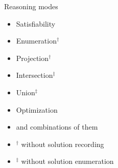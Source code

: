 \begin{frame}{Reasoning modes}
  \bigskip
  \begin{itemize}
  \item Satisfiability
  \item Enumeration$^\dagger$
  \item Projection$^\dagger$
  \item Intersection$^\ddagger$
  \item Union$^\ddagger$
  \item Optimization
    \medskip
  \item and combinations of them
  \end{itemize}
  \bigskip
  {\footnotesize
  \begin{itemize}
  \item []\hfill $^\dagger$ without solution recording
  \item []\hfill $^\ddagger$ without solution enumeration
  \end{itemize}}
\end{frame}
%
